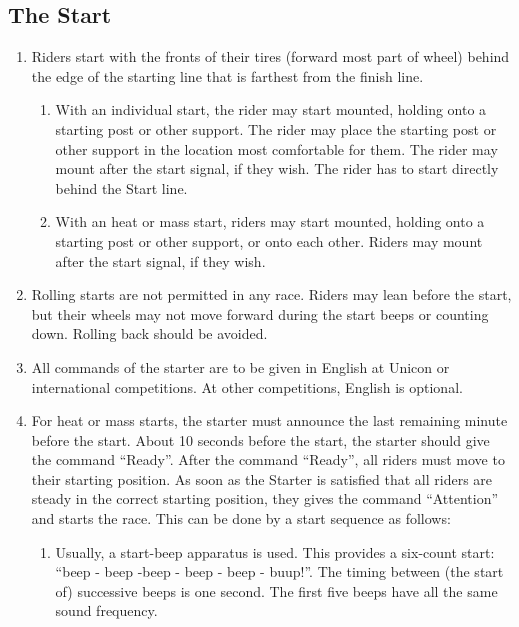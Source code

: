 \subsection{The Start}

\begin{enumerate}[leftmargin=1.5em,labelsep=*]
 	\item Riders start with the fronts of their tires (forward most part of wheel) behind the edge of the starting line that is farthest from the finish line.
	 \begin{enumerate}[label*=\arabic*,leftmargin=1.5em,labelsep=*]
	 	\item With an individual start, the rider may start mounted, holding onto a starting post or other support.
	 	The rider may place the starting post or other support in the location most comfortable for them.
	 	The rider may mount after the start signal, if they wish.
	 	The rider has to start directly behind the Start line.
 		\item With an heat or mass start, riders may start mounted, holding onto a starting post or other support, or onto each other.
 		Riders may mount after the start signal, if they wish.
	 \end{enumerate}
	 \item Rolling starts are not permitted in any race.
	 Riders may lean before the start, but their wheels may not move forward during the start beeps or counting down.
	 Rolling back should be avoided.
	 \item All commands of the starter are to be given in English at Unicon or international competitions. At other competitions, English is optional.
	 \item For heat or mass starts, the starter must announce the last remaining minute before the start.
	 About 10 seconds before the start, the starter should give the command “Ready”.
	 After the command “Ready”, all riders must move to their starting position.
	 As soon as the Starter is satisfied that all riders are steady in the correct starting position, they gives the command “Attention” and starts the race.
	 This can be done by a start sequence as follows:
	 \begin{enumerate}[label*=\arabic*,leftmargin=1.5em,labelsep=*]
	 	\item Usually, a start-beep apparatus is used.
	 	This provides a six-count start: ``beep - beep -beep - beep - beep - buup!''.
	 	The timing between (the start of) successive beeps is one second.
	 	The first five beeps have all the same sound frequency.

\end{enumerate}
\end{enumerate}
